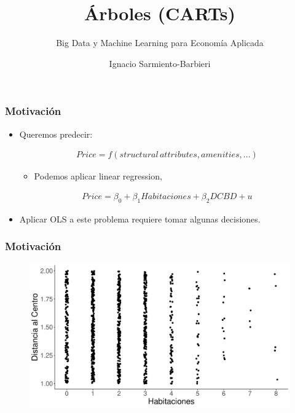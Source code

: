 \documentclass[
  shownotes,
  xcolor={svgnames},
  hyperref={colorlinks,citecolor=DarkBlue,linkcolor=andesred,urlcolor=DarkBlue}
  , aspectratio=169]{beamer}
\begin{document}
\title{Árboles (CARTs)}
\subtitle{Big Data y Machine Learning para Economía Aplicada}
\date{}

\author[Sarmiento-Barbieri]{Ignacio Sarmiento-Barbieri}


\begin{frame}[noframenumbering]
\maketitle
\end{frame}




\begin{frame}
\frametitle{Motivación}


\begin{itemize}
    \item Queremos predecir:

    \begin{align}
    Price=f(structural\,attributes,amenities,...)
    \end{align}
    \medskip
    \begin{itemize}
      \item Podemos aplicar linear regression,
    \end{itemize}
    \begin{align}
    Price=\beta_0 + \beta_1 Habitaciones + \beta_2 DCBD + u
    \end{align}
  \medskip

  \item Aplicar OLS a este problema requiere tomar algunas decisiones.
  


\end{itemize}
\end{frame}
\begin{frame}
\frametitle{Motivación}

 \begin{figure}[H] \centering
            \captionsetup{justification=centering}
              \includegraphics[scale=0.35]{figures/dcbd_hab.pdf}                           
 \end{figure}


\end{frame}
\end{document}
